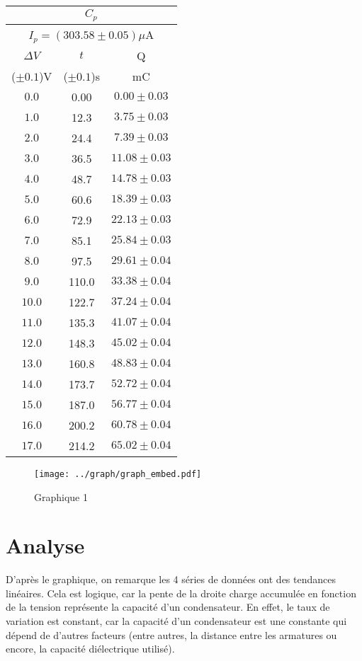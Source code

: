 \documentclass[11pt]{article}
\begin{document}
\begin{minipage}{0.45\textwidth}
\begin{center}
\begin{tabular}{|c|c|c|}
	\hline
	\multicolumn{3}{|c|}{$C_{p}$}\\
	\hline
	\multicolumn{3}{|c|}{$I_{p}=(303.58\pm 0.05)\mu$A}\\
	\hline
	$\Delta V $  & $t$          & Q\\
	($\pm 0.1$)V & ($\pm 0.1$)s & mC\\
	\hline
	$ 0.0$ &  0.00 & $ 0.00\pm 0.03$\\
	$ 1.0$ &  12.3 & $ 3.75\pm 0.03$\\
	$ 2.0$ &  24.4 & $ 7.39\pm 0.03$\\
	$ 3.0$ &  36.5 & $11.08\pm 0.03$\\
	$ 4.0$ &  48.7 & $14.78\pm 0.03$\\
	$ 5.0$ &  60.6 & $18.39\pm 0.03$\\
	$ 6.0$ &  72.9 & $22.13\pm 0.03$\\
	$ 7.0$ &  85.1 & $25.84\pm 0.03$\\
	$ 8.0$ &  97.5 & $29.61\pm 0.04$\\
	$ 9.0$ & 110.0 & $33.38\pm 0.04$\\
	$10.0$ & 122.7 & $37.24\pm 0.04$\\
	$11.0$ & 135.3 & $41.07\pm 0.04$\\
	$12.0$ & 148.3 & $45.02\pm 0.04$\\
	$13.0$ & 160.8 & $48.83\pm 0.04$\\
	$14.0$ & 173.7 & $52.72\pm 0.04$\\
	$15.0$ & 187.0 & $56.77\pm 0.04$\\
	$16.0$ & 200.2 & $60.78\pm 0.04$\\
	$17.0$ & 214.2 & $65.02\pm 0.04$\\
	\hline
\end{tabular}
\end{center}
\end{minipage} 

\begin{figure}[H]
    \centering
    \vspace*{-0.60in}
    \hspace*{-0.30in}
    \texttt{[image: ../graph/graph\_embed.pdf]}
    \caption*{Graphique 1}
\end{figure}

\section{Analyse}
D’après le graphique, on remarque les 4 séries de données ont des tendances linéaires. Cela est logique, car la pente de la droite charge accumulée en fonction de la tension représente la capacité d’un condensateur. En effet, le taux de variation est constant, car la capacité d’un condensateur est une constante qui dépend de d’autres facteurs (entre autres, la distance entre les armatures ou encore, la capacité diélectrique utilisé).\\
\end{document}
